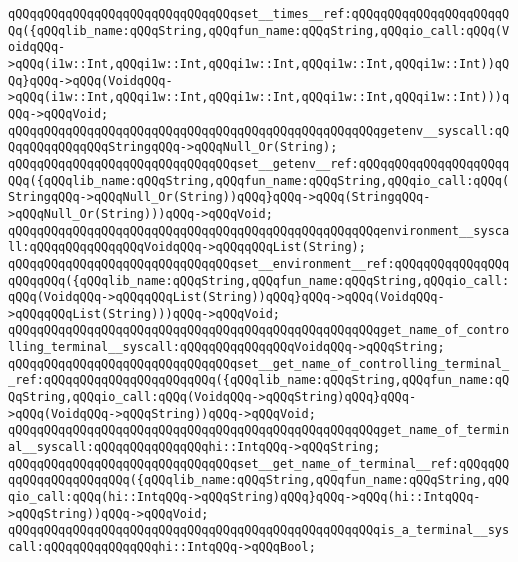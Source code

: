 \verb|qQQqqQQqqQQqqQQqqQQqqQQqqQQqqQQqset__times__ref:qQQqqQQqqQQqqQQqqQQqqQQq({qQQqlib_name:qQQqString,qQQqfun_name:qQQqString,qQQqio_call:qQQq(VoidqQQq->qQQq(i1w::Int,qQQqi1w::Int,qQQqi1w::Int,qQQqi1w::Int,qQQqi1w::Int))qQQq}qQQq->qQQq(VoidqQQq->qQQq(i1w::Int,qQQqi1w::Int,qQQqi1w::Int,qQQqi1w::Int,qQQqi1w::Int)))qQQq->qQQqVoid;|\newline
\newline
\verb|qQQqqQQqqQQqqQQqqQQqqQQqqQQqqQQqqQQqqQQqqQQqqQQqqQQqgetenv__syscall:qQQqqQQqqQQqqQQqStringqQQq->qQQqNull_Or(String);|\newline
\verb|qQQqqQQqqQQqqQQqqQQqqQQqqQQqqQQqset__getenv__ref:qQQqqQQqqQQqqQQqqQQqqQQq({qQQqlib_name:qQQqString,qQQqfun_name:qQQqString,qQQqio_call:qQQq(StringqQQq->qQQqNull_Or(String))qQQq}qQQq->qQQq(StringqQQq->qQQqNull_Or(String)))qQQq->qQQqVoid;|\newline
\newline
\verb|qQQqqQQqqQQqqQQqqQQqqQQqqQQqqQQqqQQqqQQqqQQqqQQqqQQqenvironment__syscall:qQQqqQQqqQQqqQQqVoidqQQq->qQQqqQQqList(String);|\newline
\verb|qQQqqQQqqQQqqQQqqQQqqQQqqQQqqQQqset__environment__ref:qQQqqQQqqQQqqQQqqQQqqQQq({qQQqlib_name:qQQqString,qQQqfun_name:qQQqString,qQQqio_call:qQQq(VoidqQQq->qQQqqQQqList(String))qQQq}qQQq->qQQq(VoidqQQq->qQQqqQQqList(String)))qQQq->qQQqVoid;|\newline
\newline
\verb|qQQqqQQqqQQqqQQqqQQqqQQqqQQqqQQqqQQqqQQqqQQqqQQqqQQqget_name_of_controlling_terminal__syscall:qQQqqQQqqQQqqQQqVoidqQQq->qQQqString;|\newline
\verb|qQQqqQQqqQQqqQQqqQQqqQQqqQQqqQQqset__get_name_of_controlling_terminal__ref:qQQqqQQqqQQqqQQqqQQqqQQq({qQQqlib_name:qQQqString,qQQqfun_name:qQQqString,qQQqio_call:qQQq(VoidqQQq->qQQqString)qQQq}qQQq->qQQq(VoidqQQq->qQQqString))qQQq->qQQqVoid;|\newline
\newline
\verb|qQQqqQQqqQQqqQQqqQQqqQQqqQQqqQQqqQQqqQQqqQQqqQQqqQQqget_name_of_terminal__syscall:qQQqqQQqqQQqqQQqhi::IntqQQq->qQQqString;|\newline
\verb|qQQqqQQqqQQqqQQqqQQqqQQqqQQqqQQqset__get_name_of_terminal__ref:qQQqqQQqqQQqqQQqqQQqqQQq({qQQqlib_name:qQQqString,qQQqfun_name:qQQqString,qQQqio_call:qQQq(hi::IntqQQq->qQQqString)qQQq}qQQq->qQQq(hi::IntqQQq->qQQqString))qQQq->qQQqVoid;|\newline
\newline
\verb|qQQqqQQqqQQqqQQqqQQqqQQqqQQqqQQqqQQqqQQqqQQqqQQqqQQqis_a_terminal__syscall:qQQqqQQqqQQqqQQqhi::IntqQQq->qQQqBool;|\newline
